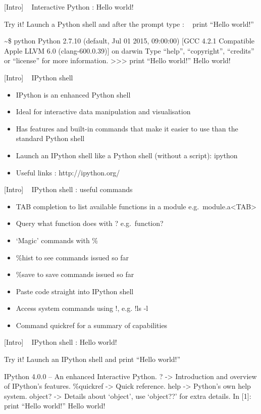 \documentclass{article}
\begin{document}
    {[}Intro{]} ~ Interactive Python : Hello world!

 Try it! Launch a Python shell and after the prompt type : ~ print
``Hello world!''

\textasciitilde{}\$ python Python 2.7.10 (default, Jul 01 2015,
09:00:00) {[}GCC 4.2.1 Compatible Apple LLVM 6.0 (clang-600.0.39){]} on
darwin Type ``help'', ``copyright'', ``credits'' or ``license'' for more
information. \textgreater{}\textgreater{}\textgreater{} print ``Hello
world!'' Hello world!

    {[}Intro{]} ~ IPython shell

\begin{itemize}
\item
  IPython is an enhanced Python shell
\item
  Ideal for interactive data manipulation and visualisation
\item
  Has features and built-in commands that make it easier to use than the
  standard Python shell
\item
  Launch an IPython shell like a Python shell (without a script):
  ipython
\item
  Useful links : http://ipython.org/
\end{itemize}

    {[}Intro{]} ~ IPython shell : useful commands

\begin{itemize}
\item
  TAB completion to list available functions in a module
  e.g.~module.a\textless{}TAB\textgreater{}
\item
  Query what function does with ? e.g.~function?
\item
  `Magic' commands with \%
\item
  \%hist to see commands issued so far
\item
  \%save to save commands issued so far
\item
  Paste code straight into IPython shell
\item
  Access system commands using !, e.g. !ls -l
\item
  Command quickref for a summary of capabilities
\end{itemize}

    {[}Intro{]} ~ IPython shell : Hello world!

Try it! Launch an IPython shell and print ``Hello world!''

IPython 4.0.0 -- An enhanced Interactive Python. ? -\textgreater{}
Introduction and overview of IPython's features. \%quickref
-\textgreater{} Quick reference. help -\textgreater{} Python's own help
system. object? -\textgreater{} Details about `object', use `object??'
for extra details. In {[}1{]}: print ``Hello world!'' Hello world!
\end{document}
